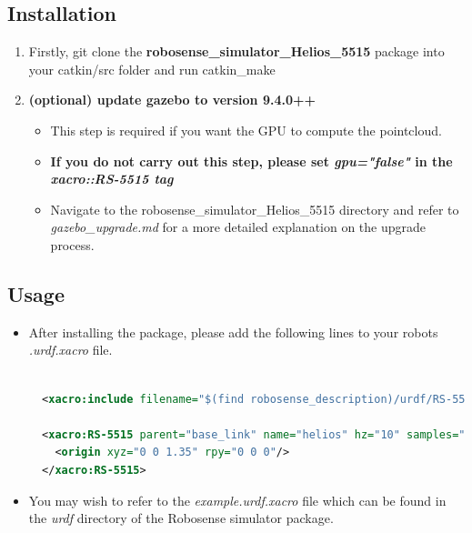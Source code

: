 \documentclass[11pt]{article}
\begin{document}
\subsection{Installation}
\begin{enumerate}
 \item {Firstly, git clone the \textbf{robosense\_simulator\_Helios\_5515} package into your catkin/src folder and run catkin\_make}
 \item{
       \textbf{(optional) update gazebo to version 9.4.0++}

       \begin{itemize}
        \item { This step is required if you want the GPU to compute the pointcloud.}
        \item {
              \textbf{If you do not carry out this step, please set \emph{gpu="false"} in the \emph{xacro::RS-5515 tag}
              }

              }
        \item{
              Navigate to the robosense\_simulator\_Helios\_5515 directory and refer to \emph{gazebo\_upgrade.md} for a more detailed explanation on the upgrade process.
              }
       \end{itemize}
       }
\end{enumerate}
\subsection{Usage}
\begin{itemize}
 \item {
       After installing the package, please add the following lines to your robots \emph{.urdf.xacro} file.
       \begin{lstlisting}[language=xml]

  <xacro:include filename="$(find robosense_description)/urdf/RS-5515.urdf.xacro"/>

  <xacro:RS-5515 parent="base_link" name="helios" hz="10" samples="1800" gpu="true" noise="0.002">
    <origin xyz="0 0 1.35" rpy="0 0 0"/>
  </xacro:RS-5515>
\end{lstlisting}
       }
 \item{
       You may wish to refer to the \emph{example.urdf.xacro} file which can be found in the \emph{urdf} directory of the Robosense simulator package.

       }
\end{itemize}
\end{document}
